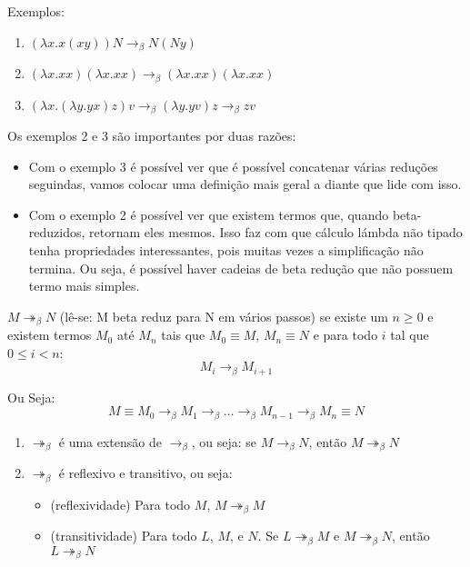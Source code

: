 \documentclass[../main.tex]{subfiles}
\begin{document}
Exemplos: 

\begin{enumerate}
    \item $(\lambda x . x (xy))N \to_{\beta} N (Ny)$
    \item $(\lambda x . xx)(\lambda x . xx) \to_{\beta} (\lambda x . xx)(\lambda x . xx)$
    \item $(\lambda x . (\lambda y . yx)z)v \to_{\beta} (\lambda y . yv)z \to_{\beta} zv$
\end{enumerate}

Os exemplos 2 e 3 são importantes por duas razões:

\begin{itemize}
    \item Com o exemplo 3 é possível ver que é possível concatenar várias reduções seguindas, vamos colocar uma definição mais geral a diante que lide com isso.
    \item Com o exemplo 2 é possível ver que existem termos que, quando beta-reduzidos, retornam eles mesmos. Isso faz com que cálculo lámbda não tipado tenha propriedades interessantes, pois muitas vezes a simplificação não termina. Ou seja, é possível haver cadeias de beta redução que não possuem termo mais simples.
\end{itemize}

\begin{definition}
    $M \twoheadrightarrow_{\beta} N$ (lê-se: M beta reduz para N em vários passos) se existe um $n \geq 0$ e existem termos $M_0$ até $M_n$ tais que $M_0 \equiv M$, $M_n \equiv N$ e para todo $i$ tal que $0 \leq i < n$: $$M_i \to_{\beta} M_{i+1}$$
\end{definition}

Ou Seja: $$M \equiv M_0 \to_{\beta} M_1 \to_{\beta} \dots \to_{\beta} M_{n-1} \to_{\beta} M_n \equiv N$$

\begin{lemma}
    \hfill
    \begin{enumerate}
        \item $\twoheadrightarrow_{\beta}$ é uma extensão de $\to_{\beta}$, ou seja: se $M \to_{\beta} N$, então $M \twoheadrightarrow_{\beta} N$
        \item $\twoheadrightarrow_{\beta}$ é reflexivo e transitivo, ou seja:
        \begin{itemize}
            \item (reflexividade) Para todo $M$, $M \twoheadrightarrow_{\beta} M$
            \item (transitividade) Para todo $L$, $M$, e $N$. Se $L \twoheadrightarrow_{\beta} M$ e $M \twoheadrightarrow_{\beta} N$, então $L \twoheadrightarrow_{\beta} N$
        \end{itemize}
    \end{enumerate}
\end{lemma}
\end{document}

